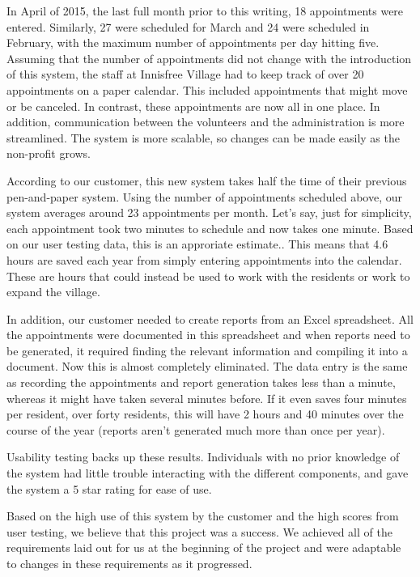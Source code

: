 \documentclass{sig-alternate}
\begin{document}
In April of 2015, the last full month prior to this writing, 18 appointments were entered. Similarly, 27 were scheduled for March and 24 were scheduled in February, with the maximum number of appointments per day hitting five. Assuming that the number of appointments did not change with the introduction of this system, the staff at Innisfree Village had to keep track of over 20 appointments on a paper calendar. This included appointments that might move or be canceled. In contrast, these appointments are now all in one place. In addition, communication between the volunteers and the administration is more streamlined. The system is more scalable, so changes can be made easily as the non-profit grows. 

According to our customer, this new system takes half the time of their previous pen-and-paper system. Using the number of appointments scheduled above, our system averages around 23 appointments per month. Let's say, just for simplicity, each appointment took two minutes to schedule and now takes one minute. Based on our user testing data, this is an approriate estimate.. This means that 4.6 hours are saved each year from simply entering appointments into the calendar. These are hours that could instead be used to work with the residents or work to expand the village.

In addition, our customer needed to create reports from an Excel spreadsheet. All the appointments were documented in this spreadsheet and when reports need to be generated, it required finding the relevant information and compiling it into a document. Now this is almost completely eliminated. The data entry is the same as recording the appointments and report generation takes less than a minute, whereas it might have taken several minutes before. If it even saves four minutes per resident, over forty residents, this will have 2 hours and 40 minutes over the course of the year (reports aren't generated much more than once per year).

Usability testing backs up these results. Individuals with no prior knowledge of the system had little trouble interacting with the different components, and gave the system a 5 star rating for ease of use.

Based on the high use of this system by the customer and the high scores from user testing, we believe that this project was a success. We achieved all of the requirements laid out for us at the beginning of the project and were adaptable to changes in these requirements as it progressed.
\end{document}
